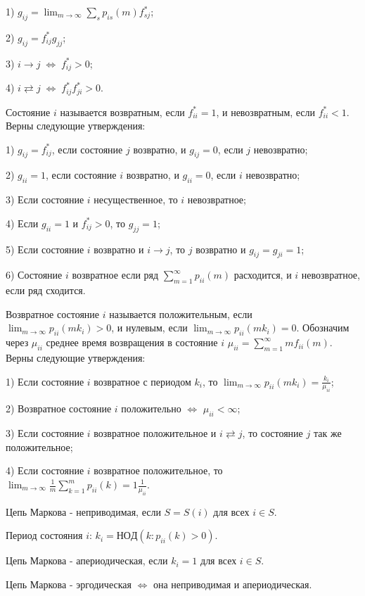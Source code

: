 1) $g_{ij}=\lim_{m \to \infty } \sum _s p_{is}(m) f^*_{sj}$;

2) $g_{ij}=f^*_{ij}g_{jj}$;

3) $i \to j \;\Leftrightarrow\; f_{ij}^* > 0$;

4) $i \rightleftarrows j \;\Leftrightarrow\; f_{ij}^* f_{ji}^* > 0$.

Состояние $i$ называется возвратным, если $f^*_{ii}=1$, и невозвратным, если $f^*_{ii}<1$.
Верны следующие утверждения:

1) $g_{ij}=f^*_{ij}$, если состояние $j$ возвратно, и $g_{ij}=0$, если $j$ невозвратно;

2) $g_{ii}=1$, если состояние $i$ возвратно, и $g_{ii}=0$, если $i$ невозвратно;

3) Если состояние $i$ несущественное, то $i$ невозвратное;

4) Если $g_{ii}=1$ и $f^*_{ij}>0$, то $g_{jj}=1$;

5) Если состояние $i$ возвратно и $i \to j$, то $j$ возвратно и $g_{ij}=g_{ji}=1$;

6) Состояние $i$ возвратное если ряд $\sum_{m=1}^\infty p_{ii}(m)$ расходится, и $i$ невозвратное, если ряд сходится.


Возвратное состояние $i$ называется положительным, если $\lim_{m \to \infty } p_{ii}(mk_i)>0$, и нулевым, если $\lim_{m \to \infty } p_{ii}(mk_i)=0$.
Обозначим через $\mu_{ii}$ среднее время возвращения в состояние $i$ $\mu_{ii}=\sum_{m=1}^\infty mf_{ii}(m)$.
Верны следующие утверждения:

1) Если состояние $i$ возвратное с периодом $k_i$, то $\lim_{m \to \infty} p_{ii} (mk_i)=\frac{k_i}{\mu _{ii}}$;

2) Возвратное состояние $i$ положительно $\Leftrightarrow$ $\mu _{ii}< \infty$;

3) Если состояние $i$ возвратное положительное и $i \rightleftarrows j$, то состояние $j$ так же положительное;

4) Если состояние $i$ возвратное положительное, то $\lim_{m \to \infty} \frac{1}{m} \sum_{k=1}^m p_{ii}(k)=1\frac{1}{\mu _{ii}}$.

Цепь Маркова - неприводимая, если $S=S(i)$ для всех $i\in S$.

Период состояния $i$: $k_i=НОД(k: p_{ii}(k)>0)$.

Цепь Маркова - апериодическая, если $k_i=1$ для всех $i\in S$.

Цепь Маркова - эргодическая $\Leftrightarrow$ она неприводимая и апериодическая.

